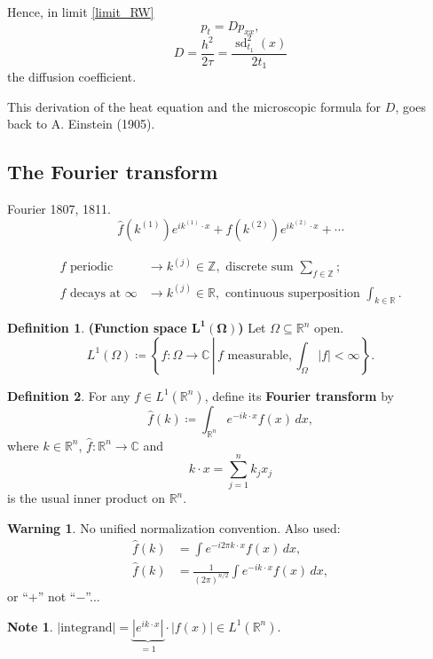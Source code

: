 \documentclass[12pt]{article}
\DeclareMathOperator{\sd}{sd}
\theoremstyle{definition}
\newtheorem*{definition*}{Definition}
\newtheorem*{note}{Note}
\newtheorem*{warning}{Warning}
\begin{document}
Hence, in limit \eqref{limit_RW}
\[p_t=Dp_{xx},\]
\[D=\frac{h^2}{2\tau}=\frac{\sd^2_{t_1}(x)}{2t_1}\]
the diffusion coefficient.

This derivation of the heat equation and the microscopic formula for $D$, goes back to A. Einstein (1905).

\subsection{The Fourier transform}
Fourier 1807, 1811.
\[\hat f(k^{(1)})e^{ik^{(1)}\cdot x}+\hat f(k^{(2)})e^{ik^{(2)}\cdot x}+\cdots\]

\begin{align*}
f\text{ periodic}&\longrightarrow k^{(j)}\in\mathbb Z,\text{ discrete sum }\sum_{f\in\mathbb Z};\\
f\text{ decays at }\infty&\longrightarrow k^{(j)}\in\mathbb R,\text{ continuous superposition }\int_{k\in\mathbb R}.
\end{align*}

\begin{definition*}
\textbf{(Function space $\boldsymbol{L^1(\Omega)}$)} Let $\Omega\subseteq\mathbb R^n$ open.
\[L^1(\Omega)\coloneqq\left\{f:\Omega\longrightarrow\mathbb C\,\left|\,f\text{ measurable},\int_\Omega|f|<\infty\right.\right\}.\]
\end{definition*}

\begin{definition*}
For any $f\in L^1(\mathbb R^n)$, define its \textbf{Fourier transform} by
\[\hat f(k)\coloneqq\int_{\mathbb R^n}e^{-ik\cdot x}f(x)\,dx,\]
where $k\in\mathbb R^n$, $\hat f:\mathbb R^n\rightarrow\mathbb C$ and
\[k\cdot x=\sum_{j=1}^nk_jx_j\]
is the usual inner product on $\mathbb R^n$.
\end{definition*}

\begin{warning}
No unified normalization convention. Also used:
\begin{align*}
\hat f(k)&=\int e^{-i2\pi k\cdot x}f(x)\,dx,\\
\hat f(k)&=\frac1{(2\pi)^{n/2}}\int e^{-ik\cdot x}f(x)\,dx,
\end{align*}
or ``$+$'' not ``$-$''...
\end{warning}

\begin{note}
$|\text{integrand}|=\underbrace{|e^{ik\cdot x}|}_{=1}\cdot|f(x)|\in L^1(\mathbb R^n)$.
\end{note}
\end{document}
